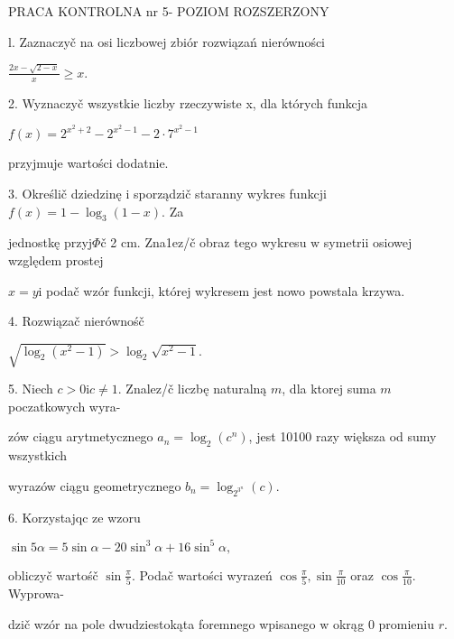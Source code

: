 \documentclass[a4paper,12pt]{article}
\begin{document}
PRACA KONTROLNA nr 5- POZIOM ROZSZERZONY

l. Zaznaczyč na osi liczbowej zbiór rozwiązań nierówności

$\displaystyle \frac{2x-\sqrt{2-x}}{x}\geq x.$

2. Wyznaczyč wszystkie liczby rzeczywiste x, dla których funkcja

$f(x)=2^{x^{2}+2}-2^{x^{2}-1}-2\cdot 7^{x^{2}-1}$

przyjmuje wartości dodatnie.

3. Określič dziedzinę $\mathrm{i}$ sporządzič staranny wykres funkcji $f(x) = 1-\log_{3}(1-x)$. Za

jednostkę przyj$\Phi$č 2 cm. Zna1ez/č obraz tego wykresu $\mathrm{w}$ symetrii osiowej względem prostej

$x=y\mathrm{i}$ podač wzór funkcji, której wykresem jest nowo powstala krzywa.

4. Rozwiązač nierównośč

$\sqrt{\log_{2}(x^{2}-1)}>\log_{2}\sqrt{x^{2}-1}.$

5. Niech $c>0\mathrm{i}c\neq 1$. Znalez/č liczbę naturalną $m$, dla ktorej suma $m$ poczatkowych wyra-

zów ciągu arytmetycznego $a_{n}=\log_{2}(c^{n})$, jest 10100 razy większa od sumy wszystkich

wyrazów ciągu geometrycznego $b_{n}=\log_{2^{3^{n}}}(c).$

6. Korzystajqc ze wzoru

$\sin 5\alpha=5\sin\alpha-20\sin^{3}\alpha+16\sin^{5}\alpha,$

obliczyč wartośč $\displaystyle \sin\frac{\pi}{5}$. Podač wartości wyrazeń $\displaystyle \cos\frac{\pi}{5}, \displaystyle \sin\frac{\pi}{10}$ oraz $\displaystyle \cos\frac{\pi}{10}$. Wyprowa-

dzič wzór na pole dwudziestokąta foremnego wpisanego $\mathrm{w}$ okrąg $0$ promieniu $r.$
\end{document}
